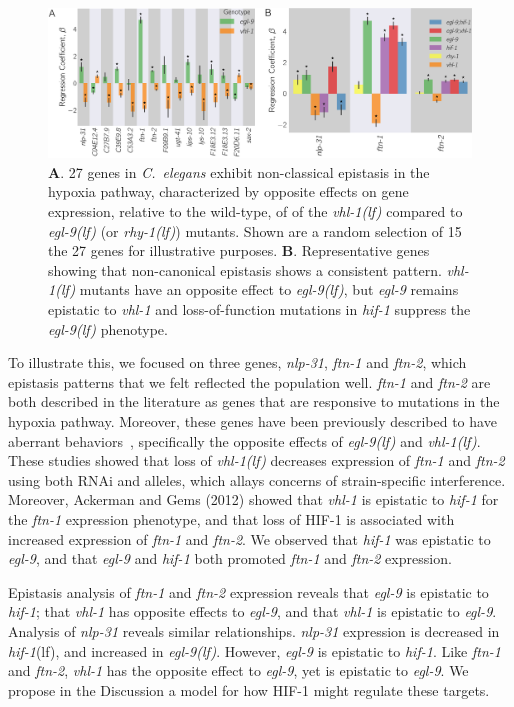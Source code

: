\documentclass[10pt, onecolumn]{article}
\newcommand{\cel}{\emph{C.~elegans}}
\newcommand{\gene}[1]{\emph{#1}}
\newcommand{\nlp}{\emph{\mbox{nlp-31}}}
\newcommand{\ftna}{\emph{\mbox{ftn-1}}}
\newcommand{\ftnb}{\emph{\mbox{ftn-2}}}
\newcommand{\egl}{\emph{\mbox{egl-9}(lf)}}
\newcommand{\rhy}{\emph{\mbox{rhy-1}(lf)}}
\newcommand{\vhl}{\emph{\mbox{vhl-1}(lf)}}
\newcommand{\hif}{\emph{\mbox{hif-1}}(lf)}
\newcommand{\hifp}{HIF-1}
\begin{document}
\begin{figure}[tbhp]
\centering
\includegraphics[width=.9\linewidth]{../figs/hif1oh-epistasis-horizontal.pdf}
\caption{
\textbf{A}. 27 genes in \cel{} exhibit non-classical epistasis in the hypoxia
pathway, characterized by opposite effects on gene expression, relative to the
wild-type, of of the \vhl{} compared to \egl{} (or
\rhy{}) mutants. Shown are a random selection of 15 the 27 genes for illustrative
purposes.
\textbf{B}. Representative genes showing that non-canonical epistasis shows a
consistent pattern. \vhl{} mutants have an opposite effect to \egl{}, but
\gene{egl-9} remains epistatic to \gene{vhl-1} and loss-of-function mutations in
\gene{hif-1} suppress the \egl{} phenotype.
}
\label{fig:hif1oh}
\end{figure}

To illustrate this, we focused on three genes, \nlp{}, \ftna{} and \ftnb{}, which
epistasis patterns that we felt reflected the population well. \ftna{} and \ftnb{}
are both described in the literature as genes that are responsive to mutations in
the hypoxia pathway. Moreover, these genes have been previously described to have
aberrant behaviors~\cite{Ackerman2012,Romney2011}, specifically the
opposite effects of \egl{} and \vhl{}. These studies showed that loss of \vhl{}
decreases expression of \ftna{} and \ftnb{} using both RNAi and alleles, which
allays concerns of strain-specific interference. Moreover, Ackerman and Gems
(2012) showed that \gene{vhl-1} is epistatic to \gene{hif-1} for the \ftna{}
expression phenotype, and that loss of
\hifp{} is associated with increased expression of \ftna{} and \ftnb{}. We observed
that \gene{hif-1} was epistatic to \gene{egl-9}, and that \gene{egl-9} and
\gene{hif-1} both promoted \ftna{} and \ftnb{} expression.

Epistasis analysis of \ftna{} and \ftnb{} expression reveals that \gene{egl-9} is
epistatic to \gene{hif-1}; that \gene{vhl-1} has opposite effects to \gene{egl-9},
and that \gene{vhl-1} is epistatic to \gene{egl-9}. Analysis of \nlp{}
reveals similar relationships. \nlp{} expression is decreased in \hif{},
and increased in \egl{}. However, \gene{egl-9} is epistatic to \gene{hif-1}.
Like \ftna{} and \ftnb{}, \gene{vhl-1} has the opposite effect to \gene{egl-9},
yet is epistatic to \gene{egl-9}. We propose in the Discussion a model for how
\hifp{} might regulate these targets.
\end{document}
